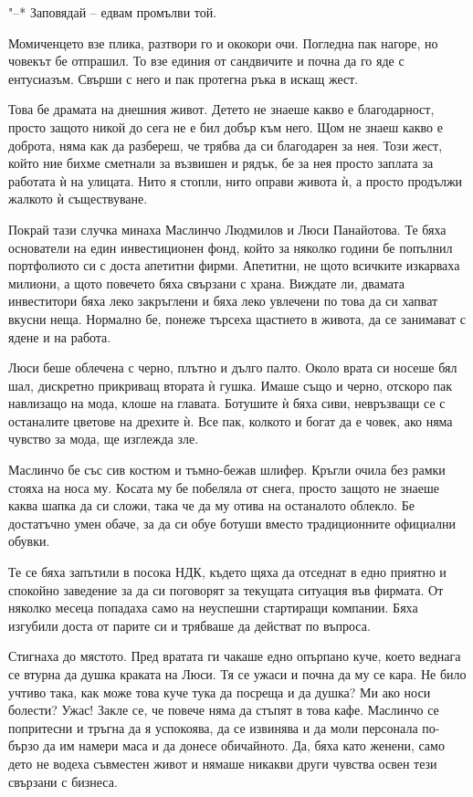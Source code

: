 \documentclass[ebook,openany,12pt]{memoir}
\begin{document}
"--* Заповядай – едвам промълви той.

Момиченцето взе плика, разтвори го и ококори очи. Погледна пак нагоре, но човекът бе отпрашил. То взе единия от сандвичите и почна да го яде с ентусиазъм. Свърши с него и пак протегна ръка в искащ жест.

Това бе драмата на днешния живот. Детето не знаеше какво е благодарност, просто защото никой до сега не е бил добър към него. Щом не знаеш какво е доброта, няма как да разбереш, че трябва да си благодарен за нея. Този жест, който ние бихме сметнали за възвишен и рядък, бе за нея просто заплата за работата ѝ на улицата. Нито я стопли, нито оправи живота ѝ, а просто продължи жалкото ѝ съществуване. 

Покрай тази случка минаха Маслинчо Людмилов и Люси Панайотова. Те бяха основатели на един инвестиционен фонд, който за няколко години бе попълнил портфолиото си с доста апетитни фирми. Апетитни, не щото всичките изкарваха милиони, а щото повечето бяха свързани с храна. Виждате ли, двамата инвеститори бяха леко закръглени и бяха леко увлечени по това да си хапват вкусни неща. Нормално бе, понеже търсеха щастието в живота, да се занимават с ядене и на работа.

Люси беше облечена с черно, плътно и дълго палто. Около врата си носеше бял шал, дискретно прикриващ втората ѝ гушка. Имаше също и черно, отскоро пак навлизащо на мода, клоше на главата. Ботушите ѝ бяха сиви, невръзващи се с останалите цветове на дрехите ѝ. Все пак, колкото и богат да е човек, ако няма чувство за мода, ще изглежда зле. 

Маслинчо бе със сив костюм и тъмно-бежав шлифер. Кръгли очила без рамки стояха на носа му. Косата му бе побеляла от снега, просто защото не знаеше каква шапка да си сложи, така че да му отива на останалото облекло. Бе достатъчно умен обаче, за да си обуе ботуши вместо традиционните официални обувки. 

Те се бяха запътили в посока НДК, където щяха да отседнат в едно приятно и спокойно заведение за да си поговорят за текущата ситуация във фирмата. От няколко месеца попадаха само на неуспешни стартиращи компании. Бяха изгубили доста от парите си и трябваше да действат по въпроса.

Стигнаха до мястото. Пред вратата ги чакаше едно опърпано куче, което веднага се втурна да душка краката на Люси. Тя се ужаси и почна да му се кара. Не било учтиво така, как може това куче тука да посреща и да душка? Ми ако носи болести? Ужас! Закле се, че повече няма да стъпят в това кафе. Маслинчо се попритесни и тръгна да я успокоява, да се извинява и да моли персонала по-бързо да им намери маса и да донесе обичайното. Да, бяха като женени, само дето не водеха съвместен живот и нямаше никакви други чувства освен тези свързани с бизнеса.
\end{document}
